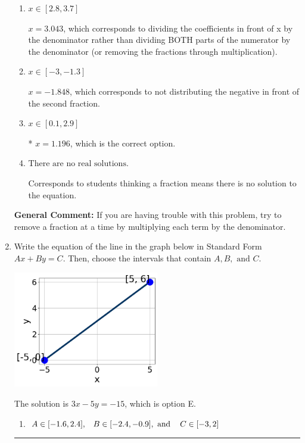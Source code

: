 \documentclass{extbook}[14pt]
\newcommand{\litem}[1]{\item #1

\rule{\textwidth}{0.4pt}}
\begin{document}
\begin{enumerate}
{\begin{enumerate}[label=\Alph*.]
 $x = -0.655$, which corresponds to dividing the second number in the numerator by the denominator rather than dividing BOTH parts of the numerator by the denominator (or removing the fractions through multiplication).
\item \( x \in [2.8, 3.7] \)

 $x = 3.043$, which corresponds to dividing the coefficients in front of x by the denominator rather than dividing BOTH parts of the numerator by the denominator (or removing the fractions through multiplication).
\item \( x \in [-3, -1.3] \)

 $x = -1.848$, which corresponds to not distributing the negative in front of the second fraction.
\item \( x \in [0.1, 2.9] \)

* $x = 1.196$, which is the correct option.
\item \( \text{There are no real solutions.} \)

Corresponds to students thinking a fraction means there is no solution to the equation.
\end{enumerate}

\textbf{General Comment:} If you are having trouble with this problem, try to remove a fraction at a time by multiplying each term by the denominator.
}
\litem{
Write the equation of the line in the graph below in Standard Form $Ax+By=C$. Then, choose the intervals that contain $A, B, \text{ and } C$.

\begin{center}
    \includegraphics[width=0.5\textwidth]{../Figures/linearGraphToStandardCopyA.png}
\end{center}


The solution is \( 3x - 5y = -15 \), which is option E.\begin{enumerate}[label=\Alph*.]
\item \( A \in [-1.6, 2.4], \hspace{3mm} B \in [-2.4, -0.9], \text{ and } \hspace{3mm} C \in [-3, 2] \)


\end{enumerate}}
\end{enumerate}
\end{document}
